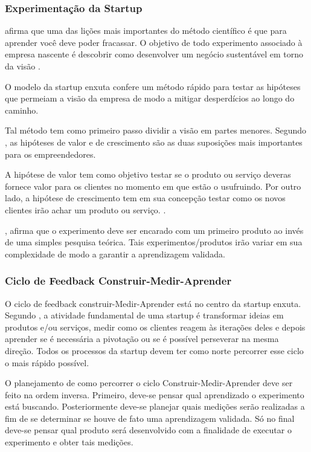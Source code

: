 \subsubsection{Experimentação da Startup}
\label{cha:experimentacao_da_startup}

 afirma que uma das lições mais importantes do método científico é que para aprender você deve poder fracassar. O objetivo de todo experimento associado à empresa nascente é descobrir como desenvolver um negócio sustentável em torno da visão \cite{leanstartup}.

O modelo da startup enxuta confere um método rápido para testar as hipóteses que permeiam a visão da empresa de modo a mitigar desperdícios ao longo do caminho.

Tal método tem como primeiro passo dividir a visão em partes menores. Segundo , as hipóteses de valor e de crescimento são as duas suposições mais importantes para os empreendedores.

A hipótese de valor tem como objetivo testar se o produto ou serviço deveras fornece valor para os clientes no momento em que estão o usufruindo. Por outro lado, a hipótese de crescimento tem em sua concepção testar como os novos clientes irão achar um produto ou serviço. \cite{leanstartup}.

, afirma que o experimento deve ser encarado com um primeiro produto ao invés de uma simples pesquisa teórica. Tais experimentos/produtos irão variar em sua complexidade de modo a garantir a aprendizagem validada.

\subsubsection{Ciclo de Feedback Construir-Medir-Aprender}
\label{cha:ciclo_cma}

O ciclo de feedback construir-Medir-Aprender está no centro da startup enxuta. Segundo , a atividade fundamental de uma startup é transformar ideias em produtos e/ou serviços, medir como os clientes reagem às iterações deles e depois aprender se é necessária a pivotação ou se é possível perseverar na mesma direção. Todos os processos da startup devem ter como norte percorrer esse ciclo o mais rápido possível.

O planejamento de como percorrer o ciclo Construir-Medir-Aprender deve ser feito na ordem inversa. Primeiro, deve-se pensar qual aprendizado o experimento está buscando. Posteriormente deve-se planejar quais medições serão realizadas a fim de se determinar se houve de fato uma aprendizagem validada. Só no final deve-se pensar qual produto será desenvolvido com a finalidade de executar o experimento e obter tais medições. \cite{leanstartup}

